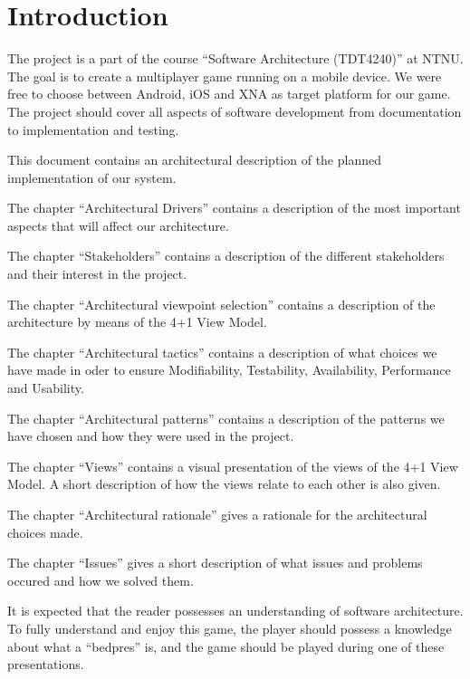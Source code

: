 \section{Introduction}
\label{sec:introduction}
The project is a part of the course ``Software Architecture (TDT4240)'' at NTNU. The goal is to create a multiplayer game running on a mobile device. We were free to choose between Android, iOS and XNA as target platform for our game. 
The project should cover all aspects of software development from documentation to implementation and testing. 

This document contains an architectural description of the planned implementation of our system.

The chapter ``Architectural Drivers'' contains a description of the most important aspects that will affect our architecture.

The chapter ``Stakeholders'' contains a description of the different stakeholders and their interest in the project. 

The chapter ``Architectural viewpoint selection'' contains a description of the architecture by means of the 4+1 View Model. 

The chapter ``Architectural tactics'' contains a description of what choices we have made in oder to ensure Modifiability, Testability, Availability, Performance and Usability. 

The chapter ``Architectural patterns'' contains a description of the patterns we have chosen and how they were used in the project.

The chapter ``Views'' contains a visual presentation of the views of the 4+1 View Model. A short description of how the views relate to each other is also given.

The chapter ``Architectural rationale'' gives a rationale for the architectural choices made.

The chapter ``Issues'' gives a short description of what issues and problems occured and how we solved them.

It is expected that the reader possesses an understanding of software
architecture. To fully understand and enjoy this game, the player should
possess a knowledge about what a ``bedpres'' is, and the game should be played
during one of these presentations.
